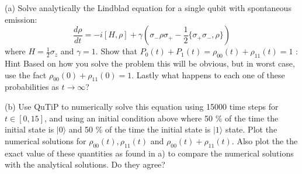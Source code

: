 \documentclass[12pt]{article}
\newcommand{\ket}[1]{| #1 \rangle}
\begin{document}
(a) Solve analytically the Lindblad equation for a single qubit with spontaneous emission:
\begin{equation}
    \frac{d\rho}{dt} = -i[H, \rho] + \gamma (\sigma_- \rho \sigma_+ - \frac{1}{2}\{\sigma_+ \sigma_-, \rho\})
\end{equation}
where $H = \frac{1}{2} \sigma_z$ and $\gamma = 1$. Show that $P_0(t) + P_1(t) = \rho_{00}(t) + \rho_{11}(t)=1 $ : Hint Based on how you solve the problem this will be obvious, but in worst case, use the fact $\rho_{00}(0) +\rho_{11}(0)=1$. Lastly what happens to each one of these probabilities as $t \rightarrow \infty$?

(b) Use QuTiP to numerically solve this equation using 15000 time steps for $t\in[0,15]$, and using an initial condition above where 50 \% of the time the initial state is $\ket{0}$ and 50 \% of the time the initial state is $\ket{1}$ state. Plot  the numerical solutions for $\rho_{00}(t), \rho_{11}(t)$ and $\rho_{00}(t) + \rho_{11}(t)$. Also plot the the exact value of these quantities as found in a) to compare the numerical solutions with the analytical solutions. Do they agree?
\end{document}
